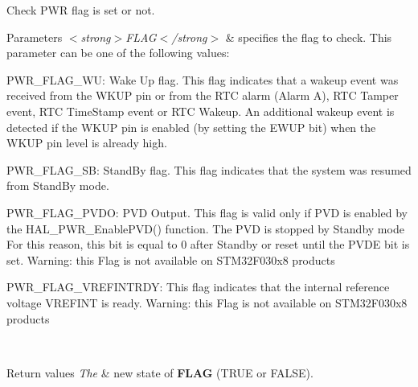 Check P\+WR flag is set or not. 


\begin{DoxyParams}{Parameters}
{\em $<$strong$>$\+F\+L\+A\+G$<$/strong$>$} & specifies the flag to check. This parameter can be one of the following values\+: \begin{DoxyItemize}
\item P\+W\+R\+\_\+\+F\+L\+A\+G\+\_\+\+WU\+: Wake Up flag. This flag indicates that a wakeup event was received from the W\+K\+UP pin or from the R\+TC alarm (Alarm A), R\+TC Tamper event, R\+TC Time\+Stamp event or R\+TC Wakeup. An additional wakeup event is detected if the W\+K\+UP pin is enabled (by setting the E\+W\+UP bit) when the W\+K\+UP pin level is already high. \item P\+W\+R\+\_\+\+F\+L\+A\+G\+\_\+\+SB\+: Stand\+By flag. This flag indicates that the system was resumed from Stand\+By mode. \item P\+W\+R\+\_\+\+F\+L\+A\+G\+\_\+\+P\+V\+DO\+: P\+VD Output. This flag is valid only if P\+VD is enabled by the H\+A\+L\+\_\+\+P\+W\+R\+\_\+\+Enable\+P\+V\+D() function. The P\+VD is stopped by Standby mode For this reason, this bit is equal to 0 after Standby or reset until the P\+V\+DE bit is set. Warning\+: this Flag is not available on S\+T\+M32\+F030x8 products \item P\+W\+R\+\_\+\+F\+L\+A\+G\+\_\+\+V\+R\+E\+F\+I\+N\+T\+R\+DY\+: This flag indicates that the internal reference voltage V\+R\+E\+F\+I\+NT is ready. Warning\+: this Flag is not available on S\+T\+M32\+F030x8 products \end{DoxyItemize}
\\
\hline
\end{DoxyParams}

\begin{DoxyRetVals}{Return values}
{\em The} & new state of {\bfseries F\+L\+AG} (T\+R\+UE or F\+A\+L\+SE). \\
\hline
\end{DoxyRetVals}
